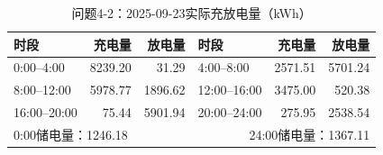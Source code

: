 \begin{table}[H]\centering\small
\caption{问题4-2：2025-09-23实际充放电量（kWh）}
\label{tab:q4_2_0923_storage}
\begin{tabular}{lrrlrr}\toprule
时段 & 充电量 & 放电量 & 时段 & 充电量 & 放电量\\\midrule
0:00--4:00 & 8239.20 & 31.29 & 4:00--8:00 & 2571.51 & 5701.24 \\
8:00--12:00 & 5978.77 & 1896.62 & 12:00--16:00 & 3475.00 & 520.38 \\
16:00--20:00 & 75.44 & 5901.94 & 20:00--24:00 & 275.95 & 2538.54 \\
\midrule\multicolumn{3}{l}{0:00储电量：1246.18} & \multicolumn{3}{r}{24:00储电量：1367.11}\\
\bottomrule\end{tabular}\end{table}
